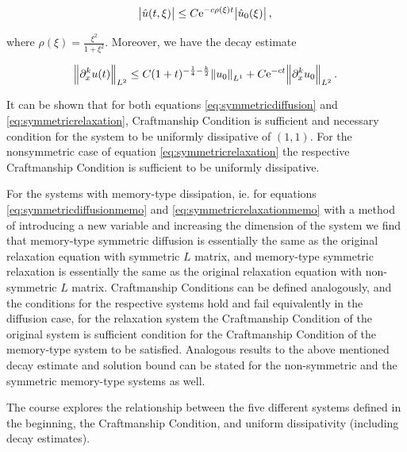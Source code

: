 \documentclass{article}
\begin{document}
\[ \abs{\hat{u}(t,\xi)} \leq C \mathrm{e}^{-c\rho(\xi)t} \abs{\hat{u}_0 (\xi)} , \]

where $\rho(\xi) = \frac{\xi^2}{1 + \xi^2}$. Moreover, we have the decay estimate

\[ \norm{\partial _{x} ^{k} u(t)}_{L^2} \leq C(1+t)^{-\frac{1}{4}-\frac{k}{2}} \norm{u_0}_{L^1} + C\mathrm{e}^{-ct} \norm{\partial ^k _x u_0}_{L^2}.\]

It can be shown that for both equations  \ref{eq:symmetricdiffusion} and \ref{eq:symmetricrelaxation}, Craftmanship Condition is sufficient and necessary condition for the system to be uniformly dissipative of $(1,1)$. For the nonsymmetric case of equation \ref{eq:symmetricrelaxation} the respective Craftmanship Condition is sufficient to be uniformly dissipative.

For the systems with memory-type dissipation, ie. for equations \ref{eq:symmetricdiffusionmemo} and \ref{eq:symmetricrelaxationmemo} with a method of introducing a new variable and increasing the dimension of the system we find that memory-type symmetric diffusion is essentially the same as the original relaxation equation with symmetric $L$ matrix, and memory-type symmetric relaxation is essentially the same as the original relaxation equation with non-symmetric $L$ matrix. Craftmanship Conditions can be defined analogously, and the conditions for the respective systems hold and fail equivalently in the diffusion case, for the relaxation system the Craftmanship Condition of the original system is sufficient condition for the Craftmanship Condition of the memory-type system to be satisfied. Analogous results to the above mentioned decay estimate and solution bound can be stated for the non-symmetric and the symmetric memory-type systems as well.

The course explores the relationship between the five different systems defined in the beginning, the Craftmanship Condition, and uniform dissipativity (including decay estimates).
\end{document}
